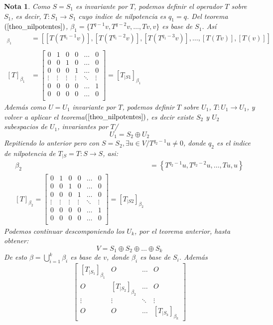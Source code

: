 \documentclass[10pt,a4paper]{article}
\newtheorem{mynote}{Nota}
\begin{document}
\begin{mynote}
	Como $S = S_{1}$ es invariante por $T$, podemos definir el operador $T$ sobre $S_{1}$, es decir, $T:S_{1}\rightarrow S_{1}$ cuyo indice de nilpotencia es $q_{1} = q$.
Del teorema $(\ref{theo_nilpotentes})$, $\beta_{1} = \{T^{q-1}v, T^{q-2}v,\ldots,Tv, v\}$ es base de $S_{1}$.
Así 
\begin{align*}
	[T]_{\beta_{1}} &= 
	\left[
	\left[T\left(T^{q_{1}-1}v\right)\right], 
	\left[T\left(T^{q_{1}-2}v\right)\right],
	\left[T\left(T^{q_{1}-3}v\right)\right],
	\ldots,
	\left[T\left(Tv\right)\right],
	\left[T\left(v\right)\right]	
	\right]\\\\
	[T]_{\beta_{1}} &= 
	\begin{bmatrix}
		0	&	1	&	0	&	0	&	\ldots	&	0\\
		0	&	0	&	1	&	0	&	\ldots	&	0\\
		0	&	0	&	0	&	1	&	\ldots	&	0\\
		\vdots	&	\vdots	&	\vdots	&	\vdots	&	\ddots	&	\vdots\\
		0	&	0	&	0	&	0	&	\ldots	&	1\\
		0	&	0	&	0	&	0	&	\ldots	&	0\\
	\end{bmatrix} = [T_{|S1}]_{\beta_{1}}
\end{align*}
Además como $U = U_{1}$ invariante por $T$, podemos definir $T$ sobre $U_{1}$, $T: U_{1}\rightarrow U_{1}$, y volver a aplicar el \textit{teorema}$(\ref{theo_nilpotentes})$, es decir existe $S_{2}$ y $U_{2}$ subespacios de $U_{1}$, invariantes por $T$/
$$U_{1} = S_{2}\oplus U_{2}$$
Repitiendo lo anterior pero con $S = S_{2},\exists u\in V/T^{q_{2}-1}u\neq 0$, donde $q_{2}$ es el indice de nilpotencia de $T_{|S} = T:S\rightarrow S$, asi:
\begin{align*}
	\beta_{2} &= \left\{T^{q_{2}-1}u, T^{q_{2}-2}u,\ldots,Tu, u\right\}\\
	[T]_{\beta_{2}} = 
	\begin{bmatrix}
		0	&	1	&	0	&	0	&	\ldots	&	0\\
		0	&	0	&	1	&	0	&	\ldots	&	0\\
		0	&	0	&	0	&	1	&	\ldots	&	0\\
		\vdots	&	\vdots	&	\vdots	&	\vdots	&	\ddots	&	\vdots\\
		0	&	0	&	0	&	0	&	\ldots	&	1\\
		0	&	0	&	0	&	0	&	\ldots	&	0\\
	\end{bmatrix} = [T_{|S2}]_{\beta_{2}}
\end{align*}
Podemos continuar descomponiendo los $U_{k}$, por el teorema anterior, hasta obtener:
$$V = S_{1}\oplus S_{2}\oplus \ldots \oplus S_{k}$$
De esto $\beta = \bigcup_{i=1}^{k}\beta_{i}$ es base de $v$, donde $\beta_{i}$ es base de $S_{i}$.
Además
$$\begin{bmatrix}
	\left[T_{|S_{1}}\right]_{\beta_{1}}	&	O	&	\ldots	&	O\\
	O	&	\left[T_{|S_{2}}\right]_{\beta_{2}}	&	\ldots	&	O\\
	\vdots	&	\vdots	& \ddots	& \vdots\\
	O	&	O	&	\ldots	&	\left[T_{|S_{k}}\right]_{\beta_{k}}
\end{bmatrix}$$


\end{mynote}
\end{document}
